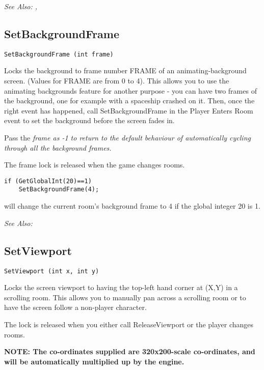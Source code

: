 \it{See Also:} , 


\subsection{SetBackgroundFrame}\label{SetBackgroundFrame}%

\begin{verbatim}
SetBackgroundFrame (int frame)
\end{verbatim}
Locks the background to frame number FRAME of an animating-background
screen. (Values for FRAME are from 0 to 4). This allows you to use the
animating backgrounds feature for another purpose - you can have two
frames of the background, one for example with a spaceship crashed on it.
Then, once the right event has happened, call SetBackgroundFrame in the
Player Enters Room event to set the background before the screen fades in.

Pass the \it{frame} as -1 to return to the default behaviour of automatically
cycling through all the background frames.

The frame lock is released when the game changes rooms.

\begin{verbatim}
if (GetGlobalInt(20)==1)
    SetBackgroundFrame(4);
\end{verbatim}
will change the current room's background frame to 4 if the global integer 20 is 1.

\it{See Also:} 


\subsection{SetViewport}\label{SetViewport}%

\begin{verbatim}
SetViewport (int x, int y)
\end{verbatim}
Locks the screen viewport to having the top-left hand corner at (X,Y) in
a scrolling room. This allows you to manually pan across a scrolling room
or to have the screen follow a non-player character.

The lock is released when you either call ReleaseViewport or the player
changes rooms.

\bf{NOTE:} The co-ordinates supplied are 320x200-scale co-ordinates, and will
be automatically multiplied up by the engine.


